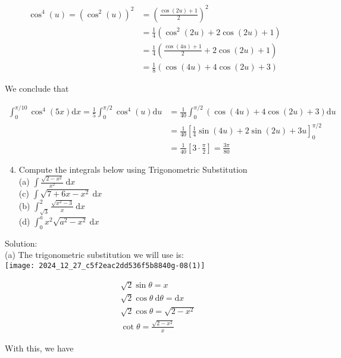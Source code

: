 \documentclass[10pt]{article}
\begin{document}
$$
\begin{aligned}
\cos ^{4}(u)=\left(\cos ^{2}(u)\right)^{2} & =\left(\frac{\cos (2 u)+1}{2}\right)^{2} \\
& =\frac{1}{4}\left(\cos ^{2}(2 u)+2 \cos (2 u)+1\right) \\
& =\frac{1}{4}\left(\frac{\cos (4 u)+1}{2}+2 \cos (2 u)+1\right) \\
& =\frac{1}{8}(\cos (4 u)+4 \cos (2 u)+3)
\end{aligned}
$$

We conclude that

$$
\begin{aligned}
\int_{0}^{\pi / 10} \cos ^{4}(5 x) \mathrm{d} x=\frac{1}{5} \int_{0}^{\pi / 2} \cos ^{4}(u) \mathrm{d} u & =\frac{1}{40} \int_{0}^{\pi / 2}(\cos (4 u)+4 \cos (2 u)+3) \mathrm{d} u \\
& =\frac{1}{40}\left[\frac{1}{4} \sin (4 u)+2 \sin (2 u)+3 u\right]_{0}^{\pi / 2} \\
& =\frac{1}{40}\left[3 \cdot \frac{\pi}{2}\right]=\frac{3 \pi}{80}
\end{aligned}
$$

\begin{enumerate}
  \setcounter{enumi}{3}
  \item Compute the integrals below using Trigonometric Substitution\\
(a) $\int \frac{\sqrt{2-x^{2}}}{x^{2}} \mathrm{~d} x$\\
(c) $\int \sqrt{7+6 x-x^{2}} \mathrm{~d} x$\\
(b) $\int_{\sqrt{3}}^{2} \frac{\sqrt{x^{2}-3}}{x} \mathrm{~d} x$\\
(d) $\int_{0}^{a} x^{2} \sqrt{a^{2}-x^{2}} \mathrm{~d} x$
\end{enumerate}

Solution:\\
(a) The trigonometric substitution we will use is:\\
\texttt{[image: 2024\_12\_27\_c5f2eac2dd536f5b8840g-08(1)]}

$$
\begin{aligned}
& \sqrt{2} \sin \theta=x \\
& \sqrt{2} \cos \theta \mathrm{~d} \theta=\mathrm{d} x \\
& \sqrt{2} \cos \theta=\sqrt{2-x^{2}} \\
& \cot \theta=\frac{\sqrt{2-x^{2}}}{x}
\end{aligned}
$$

With this, we have
\end{document}
